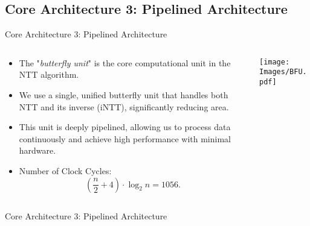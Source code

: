 \documentclass[
	10pt, t,
	hyperref={
		colorlinks,
		citecolor=CtpLatteTeal,
		linkcolor=CtpLatteTeal,
		urlcolor=CtpLatteBlue,
		pdfauthor={Bardia Taghavi},
		pdftitle={LightNTT: A Tiny NTT/iNTT Core for ML-DSA Featuring a Constant-Geometry Pipelined Design},
		pdfsubject={Cryptography},
		pdfkeywords={NTT, iNTT, ML-DSA, Constant-Geometry Pipelined Design},
		pdfcreator={Bardia Taghavi},
		pdfproducer={Bardia Taghavi}
		},
	aspectratio=1610,
	]
	{beamer}
\begin{document}
\subsection{Core Architecture 3: Pipelined Architecture}
\begin{frame}{Core Architecture 3: Pipelined Architecture}
	\begin{columns}
		\begin{column}{0.5\textwidth}
			\begin{itemize}\setlength{\itemsep}{1em}
				\item The "\textit{butterfly unit}" is the core computational unit in the NTT algorithm.
				\item We use a single, unified butterfly unit that handles both NTT and its inverse (iNTT), significantly reducing area.
				\item This unit is deeply pipelined, allowing us to process data continuously and achieve high performance with minimal hardware.
				\item Number of Clock Cycles: \[(\dfrac{n}{2} + 4) \cdot \log_2 n = 1056.\]
			\end{itemize}
		\end{column}
		\begin{column}{0.5\textwidth}
			\begin{center}
				\texttt{[image: Images/BFU.pdf]}
			\end{center}
		\end{column}
	\end{columns}
\end{frame}
\begin{frame}{Core Architecture 3: Pipelined Architecture}
	\begin{figure}
	\end{figure}
\end{frame}
\end{document}
